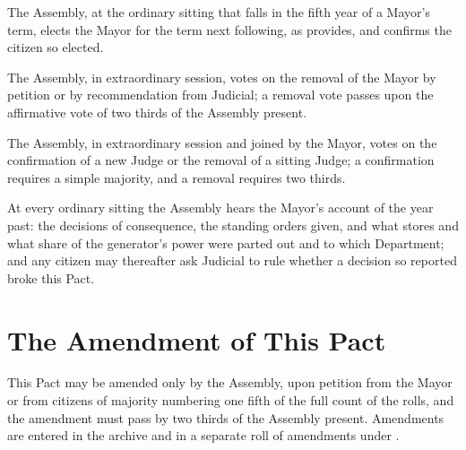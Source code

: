 \begin{clauses}
\item The Assembly, at the ordinary sitting that falls in the fifth year of a Mayor's term, elects the Mayor for the term next following, as  provides, and confirms the citizen so elected.
\item The Assembly, in extraordinary session, votes on the removal of the Mayor by petition or by recommendation from Judicial; a removal vote passes upon the affirmative vote of two thirds of the Assembly present.
\item The Assembly, in extraordinary session and joined by the Mayor, votes on the confirmation of a new Judge or the removal of a sitting Judge; a confirmation requires a simple majority, and a removal requires two thirds.
\item At every ordinary sitting the Assembly hears the Mayor's account of the year past: the decisions of consequence, the standing orders given, and what stores and what share of the generator's power were parted out and to which Department; and any citizen may thereafter ask Judicial to rule whether a decision so reported broke this Pact.
\end{clauses}

\section{The Amendment of This Pact}
\label{sec:assembly:amendment-of-this-pact}

This Pact may be amended only by the Assembly, upon petition from the Mayor or from citizens of majority numbering one fifth of the full count of the rolls, and the amendment must pass by two thirds of the Assembly present. Amendments are entered in the archive and in a separate roll of amendments under .

